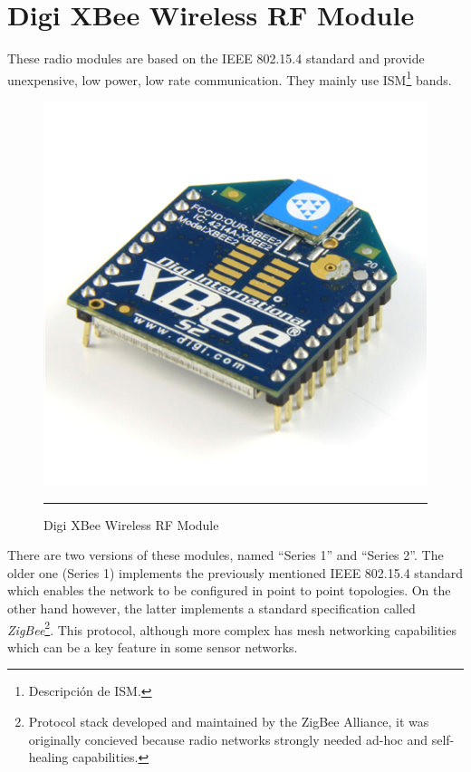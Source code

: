 
\section{Digi XBee\textregistered{} Wireless RF Module}
\label{sec:xbee}

These radio modules are based on the IEEE 802.15.4 standard and provide unexpensive, low power, low rate communication. They mainly use ISM\footnote{Descripción de ISM.} bands. 

\begin{figure}[htbp]
    \centering
    \includegraphics[scale=0.4]{./Figures/xbee.png}
        \rule{35em}{0.5pt}
        \caption[Digi XBee RF Module]{Digi XBee\textregistered{} Wireless RF Module}
    \label{fig:XBee RF Module}
\end{figure}

There are two versions of these modules, named ``Series 1'' and ``Series 2''. The older one (Series 1) implements the previously mentioned IEEE 802.15.4 standard which enables the network to be configured in point to point topologies. On the other hand however, the latter implements a standard specification called \emph{ZigBee}\footnote{Protocol stack developed and maintained by the ZigBee Alliance, it was originally concieved because radio networks strongly needed ad-hoc and self-healing capabilities.}. This protocol, although more complex has mesh networking capabilities which can be a key feature in some sensor networks.

